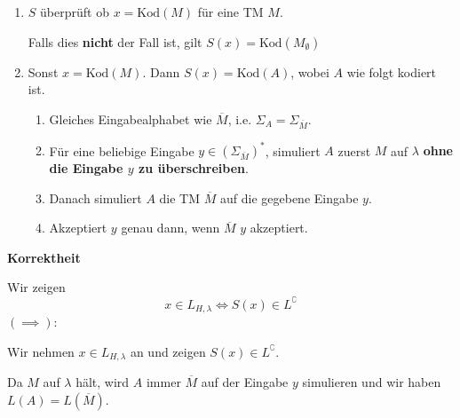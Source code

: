 \documentclass[a4paper, 11pt]{article}
\newcommand\myTitle[1]{{\large \textbf {#1}}}
\begin{document}
                        \begin{enumerate}[label=\arabic*.]
                            
                            \item $S$ überprüft ob $x = \text{Kod}(M)$ für eine TM $M$.
                            
                            Falls dies \textbf{nicht} der Fall ist, gilt $S(x) = \text{Kod}(M_{\emptyset})$
                            
                            \item Sonst $x = \text{Kod}(M)$. Dann $S(x) = \text{Kod}(A)$, wobei $A$ wie folgt kodiert ist.
                            \begin{enumerate}[label=\roman*.]
                                \item Gleiches Eingabealphabet wie $\overline{M}$, i.e. $\Sigma_A = \Sigma_{\overline{M}}$.
                                
                                \item Für eine beliebige Eingabe $y \in (\Sigma_{\overline{M}})^*$, 
                                simuliert $A$ zuerst $M$ auf $\lambda$ \textbf{ohne die Eingabe $y$ zu überschreiben}.
                                
                                \item Danach simuliert $A$ die TM $\overline{M}$ auf die gegebene Eingabe $y$.
                                \item Akzeptiert $y$ genau dann, wenn $\overline{M}$ $y$ akzeptiert.
                            \end{enumerate}
                        \end{enumerate}
                    
                    
                    
                        \myTitle{Korrektheit}

                        Wir zeigen 
                        $$x \in L_{H, \lambda} \iff S(x) \in L^\complement$$
                        $\mathbf{(\implies):}$
                        
                        Wir nehmen \textbf{$x \in L_{H, \lambda}$} an und zeigen $S(x) \in L^\complement$.
                        
                        
                        Da $M$ auf $\lambda$ hält, wird $A$ immer $\overline{M}$ auf der Eingabe $y$ simulieren und wir haben $L(A) = L(\overline{M})$.
                    
\end{document}
